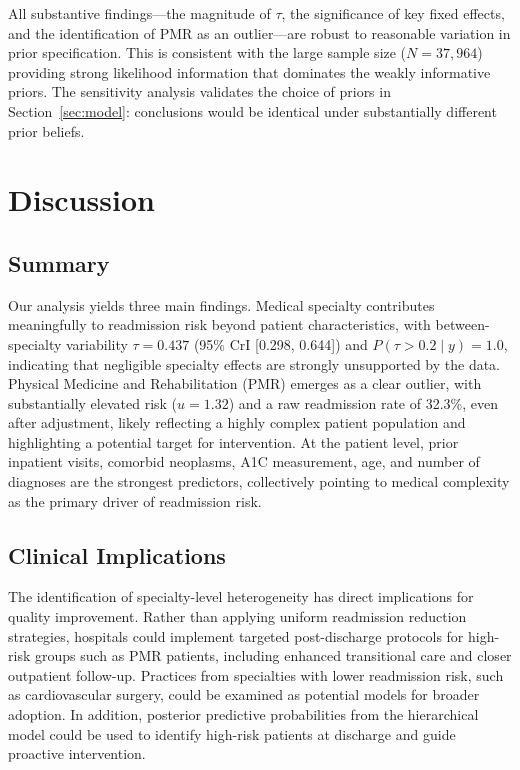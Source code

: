 \documentclass[10pt]{article}
\begin{document}
All substantive findings---the magnitude of $\tau$, the significance of key
fixed effects, and the identification of PMR as an outlier---are robust to
reasonable variation in prior specification.  This is consistent with the
large sample size ($N = 37{,}964$) providing strong likelihood information
that dominates the weakly informative priors.  The sensitivity analysis
validates the choice of priors in Section~\ref{sec:model}: conclusions
would be identical under substantially different prior beliefs.

\section{Discussion}
\label{sec:discussion}

\subsection{Summary}

Our analysis yields three main findings. Medical specialty contributes meaningfully to readmission risk beyond patient characteristics, with between-specialty variability $\tau = 0.437$ (95\% CrI [0.298, 0.644]) and $P(\tau > 0.2 \mid y) = 1.0$, indicating that negligible specialty effects are strongly unsupported by the data. Physical Medicine and Rehabilitation (PMR) emerges as a clear outlier, with substantially elevated risk ($u = 1.32$) and a raw readmission rate of 32.3\%, even after adjustment, likely reflecting a highly complex patient population and highlighting a potential target for intervention. At the patient level, prior inpatient visits, comorbid neoplasms, A1C measurement, age, and number of diagnoses are the strongest predictors, collectively pointing to medical complexity as the primary driver of readmission risk.

\subsection{Clinical Implications}

The identification of specialty-level heterogeneity has direct implications for quality improvement. Rather than applying uniform readmission reduction strategies, hospitals could implement targeted post-discharge protocols for high-risk groups such as PMR patients, including enhanced transitional care and closer outpatient follow-up. Practices from specialties with lower readmission risk, such as cardiovascular surgery, could be examined as potential models for broader adoption. In addition, posterior predictive probabilities from the hierarchical model could be used to identify high-risk patients at discharge and guide proactive intervention.
\end{document}
